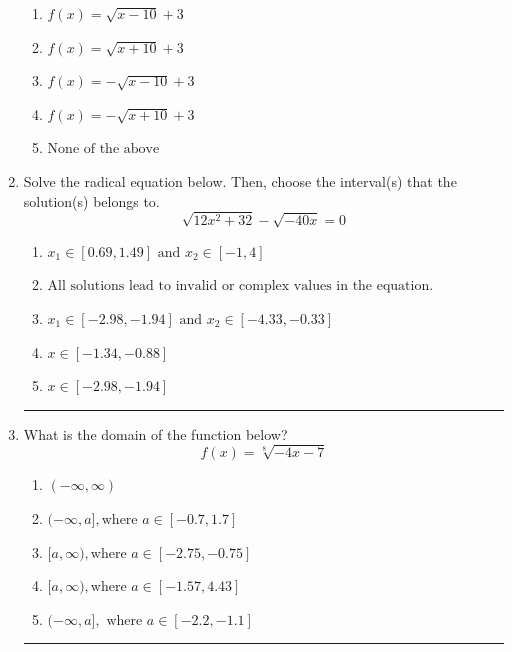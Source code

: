 \documentclass[14pt]{extbook}
\newcommand{\litem}[1]{\item#1\hspace*{-1cm}\rule{\textwidth}{0.4pt}}
\begin{document}
\begin{enumerate}
{\begin{center}
\end{center}
\begin{enumerate}[label=\Alph*.]
\item \( f(x) = \sqrt{x - 10} + 3 \)
\item \( f(x) = \sqrt{x + 10} + 3 \)
\item \( f(x) = - \sqrt{x - 10} + 3 \)
\item \( f(x) = - \sqrt{x + 10} + 3 \)
\item \( \text{None of the above} \)

\end{enumerate} }
\litem{
Solve the radical equation below. Then, choose the interval(s) that the solution(s) belongs to.\[ \sqrt{12 x^2 + 32} - \sqrt{-40 x} = 0 \]\begin{enumerate}[label=\Alph*.]
\item \( x_1 \in [0.69, 1.49] \text{ and } x_2 \in [-1,4] \)
\item \( \text{All solutions lead to invalid or complex values in the equation.} \)
\item \( x_1 \in [-2.98, -1.94] \text{ and } x_2 \in [-4.33,-0.33] \)
\item \( x \in [-1.34,-0.88] \)
\item \( x \in [-2.98,-1.94] \)

\end{enumerate} }
\litem{
What is the domain of the function below?\[ f(x) = \sqrt[8]{-4 x - 7} \]\begin{enumerate}[label=\Alph*.]
\item \( (-\infty, \infty) \)
\item \( (-\infty, a], \text{where } a \in [-0.7, 1.7] \)
\item \( [a, \infty), \text{where } a \in [-2.75, -0.75] \)
\item \( [a, \infty), \text{where } a \in [-1.57, 4.43] \)
\item \( (-\infty, a], \text{ where } a \in [-2.2, -1.1] \)


\end{enumerate}}
\end{enumerate}
\end{document}
